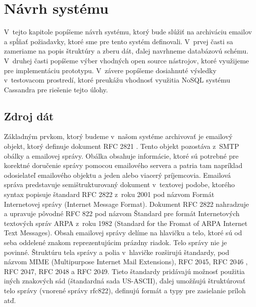 \documentclass[11pt,twoside,a4paper]{book}
\begin{document}
\chapter{Návrh systému}

V~tejto kapitole popíšeme návrh systému, ktorý bude slúžiť na archiváciu emailov a spĺňať požiadavky, ktoré sme pre tento systém definovali. V~prvej časti sa zameriame na popis štruktúry a zberu dát, ďalej navrhneme databázovú schému. V~druhej časti popíšeme výber vhodných open source nástrojov, ktoré využijeme pre implementáciu prototypu. V~závere popíšeme dosiahnuté výsledky v~testovacom prostredí, ktoré preukážu vhodnosť využitia NoSQL systému Cassandra pre riešenie tejto úlohy.

\section{Zdroj dát}
Základným prvkom, ktorý budeme v~našom systéme archivovať je emailový objekt, ktorý definuje dokument RFC 2821 \cite{Klensin:2001:SMT:RFC2821}. Tento objekt pozostáva z~SMTP obálky a emailovej správy. Obálka obsahuje informácie, ktoré sú potrebné pre korektné doručenie správy pomocou emailového servera a patria tam napríklad odosielateľ emailového objektu a jeden alebo viacerý príjemcovia. Emailová správa predstavuje semištrukturovaný dokument \cite{Udell} v~textovej podobe, ktorého syntax popisuje štandard RFC 2822 \cite{Resnick:2001:IMF:RFC2822} z~roku 2001 pod názvom Formát Internetovej správy (Internet Message Format). Dokument RFC 2822 nahradzuje a upravuje pôvodné RFC 822 pod názvom Štandard pre formát Internetových textových správ ARPA z~roku 1982 (Standard for the Fromat of ARPA Internet Text Messages). Obsah emailovej správy delíme na hlavičku a telo, ktoré sú od seba oddelené znakom reprezentujúcim prázdny riadok. Telo správy nie je povinné. Štruktúru tela správy a polia v~hlavičke rozširujú štandardy, pod názvom MIME (Multipurpose Internet Mail Extensions), RFC 2045, RFC 2046 \cite{Freed:1996:MIM:RFC2045,Freed:1996:MIM:RFC2046}, RFC 2047, RFC 2048 a RFC 2049. Tieto štandardy pridávajú možnosť použitia iných znakových sád (štandardná sada US-ASCII), ďalej umožňujú štruktúrovať telo správy (vnorené správy rfc822), definujú formát a typy pre zasielanie príloh atď.
\end{document}
